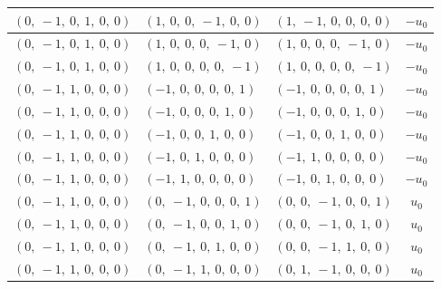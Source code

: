 \documentclass[11pt]{article}
\theoremstyle{definition}
\begin{document}
\begin{longtable}{|l|l|l|c|}
    \hline
    $\left( 0, \  -1, \  0, \  1, \  0, \  0\right)$ & $\left( 1, \  0, \  0, \  -1, \  0, \  0\right)$ & $\left( 1, \  -1, \  0, \  0, \  0, \  0\right)$ & $- u_{0}$ \\
    \hline
    $\left( 0, \  -1, \  0, \  1, \  0, \  0\right)$ & $\left( 1, \  0, \  0, \  0, \  -1, \  0\right)$ & $\left( 1, \  0, \  0, \  0, \  -1, \  0\right)$ & $- u_{0}$ \\
    \hline
    $\left( 0, \  -1, \  0, \  1, \  0, \  0\right)$ & $\left( 1, \  0, \  0, \  0, \  0, \  -1\right)$ & $\left( 1, \  0, \  0, \  0, \  0, \  -1\right)$ & $- u_{0}$ \\
    \hline
    $\left( 0, \  -1, \  1, \  0, \  0, \  0\right)$ & $\left( -1, \  0, \  0, \  0, \  0, \  1\right)$ & $\left( -1, \  0, \  0, \  0, \  0, \  1\right)$ & $- u_{0}$ \\
    \hline
    $\left( 0, \  -1, \  1, \  0, \  0, \  0\right)$ & $\left( -1, \  0, \  0, \  0, \  1, \  0\right)$ & $\left( -1, \  0, \  0, \  0, \  1, \  0\right)$ & $- u_{0}$ \\
    \hline
    $\left( 0, \  -1, \  1, \  0, \  0, \  0\right)$ & $\left( -1, \  0, \  0, \  1, \  0, \  0\right)$ & $\left( -1, \  0, \  0, \  1, \  0, \  0\right)$ & $- u_{0}$ \\
    \hline
    $\left( 0, \  -1, \  1, \  0, \  0, \  0\right)$ & $\left( -1, \  0, \  1, \  0, \  0, \  0\right)$ & $\left( -1, \  1, \  0, \  0, \  0, \  0\right)$ & $- u_{0}$ \\
    \hline
    $\left( 0, \  -1, \  1, \  0, \  0, \  0\right)$ & $\left( -1, \  1, \  0, \  0, \  0, \  0\right)$ & $\left( -1, \  0, \  1, \  0, \  0, \  0\right)$ & $- u_{0}$ \\
    \hline
    $\left( 0, \  -1, \  1, \  0, \  0, \  0\right)$ & $\left( 0, \  -1, \  0, \  0, \  0, \  1\right)$ & $\left( 0, \  0, \  -1, \  0, \  0, \  1\right)$ & $u_{0}$ \\
    \hline
    $\left( 0, \  -1, \  1, \  0, \  0, \  0\right)$ & $\left( 0, \  -1, \  0, \  0, \  1, \  0\right)$ & $\left( 0, \  0, \  -1, \  0, \  1, \  0\right)$ & $u_{0}$ \\
    \hline
    $\left( 0, \  -1, \  1, \  0, \  0, \  0\right)$ & $\left( 0, \  -1, \  0, \  1, \  0, \  0\right)$ & $\left( 0, \  0, \  -1, \  1, \  0, \  0\right)$ & $u_{0}$ \\
    \hline
    $\left( 0, \  -1, \  1, \  0, \  0, \  0\right)$ & $\left( 0, \  -1, \  1, \  0, \  0, \  0\right)$ & $\left( 0, \  1, \  -1, \  0, \  0, \  0\right)$ & $u_{0}$ \\

\end{longtable}
\end{document}
